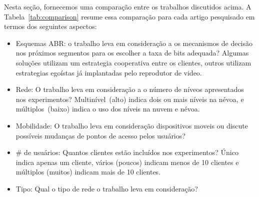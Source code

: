 Nesta seção, fornecemos uma comparação entre os trabalhos discutidos acima.
A Tabela~\ref{tab:comparison} resume essa comparação para cada artigo pesquisado em termos dos seguintes aspectos:

\begin{itemize}

\item Esquemas ABR: o trabalho leva em consideração a os mecanismos de decisão nos próximos segmentos para os escolher a taxa de bits adequada? Algumas soluções utilizam um estrategia cooperativa entre os clientes, outros utilizam estrategias egoístas já implantadas pelo reprodutor de video.

\item Rede: O trabalho leva em consideração a o número de níveos apresentados nos experimentos? Multinível~(alto) indica dois ou mais níveis na névoa, e múltiplos~(baixo) indica o uso dos níveis na nuvem e névoa.

\item Mobilidade: O trabalho leva em consideração dispositivos moveis ou discute possíveis mudanças de pontos de acesso pelos usuários?

\item \# de usuários: Quantos clientes estão incluídos nos experimentos? Único indica apenas um cliente, vários (poucos) indicam menos de 10 clientes e múltiplos (muitos) indicam mais de 10 clientes.

\item Tipo: Qual o tipo de rede o trabalho leva em consideração?

\end{itemize}

